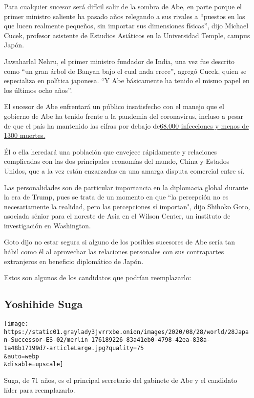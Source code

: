 Para cualquier sucesor será difícil salir de la sombra de Abe, en parte
porque el primer ministro saliente ha pasado años relegando a sus
rivales a ``puestos en los que lucen realmente pequeños, sin importar
sus dimensiones físicas'', dijo Michael Cucek, profesor asistente de
Estudios Asiáticos en la Universidad Temple, campus Japón.

Jawaharlal Nehru, el primer ministro fundador de India, una vez fue
descrito como ``un gran árbol de Banyan bajo el cual nada crece'',
agregó Cucek, quien se especializa en política japonesa. ``Y Abe
básicamente ha tenido el mismo papel en los últimos ocho años''.

El sucesor de Abe enfrentará un público insatisfecho con el manejo que
el gobierno de Abe ha tenido frente a la pandemia del coronavirus,
incluso a pesar de que el país ha mantenido las cifras por debajo
de\href{https://www.nytimes3xbfgragh.onion/interactive/2020/world/coronavirus-maps.html}{68.000
infecciones y menos de 1300 muertes.}

Él o ella heredará una población que envejece rápidamente y relaciones
complicadas con las dos principales economías del mundo, China y Estados
Unidos, que a la vez están enzarzadas en una amarga disputa comercial
entre sí.

Las personalidades son de particular importancia en la diplomacia global
durante la era de Trump, pues se trata de un momento en que ``la
percepción no es necesariamente la realidad, pero las percepciones sí
importan", dijo Shihoko Goto, asociada sénior para el noreste de Asia en
el Wilson Center, un instituto de investigación en Washington.

Goto dijo no estar segura si alguno de los posibles sucesores de Abe
sería tan hábil como él al aprovechar las relaciones personales con sus
contrapartes extranjeros en beneficio diplomático de Japón.

Estos son algunos de los candidatos que podrían reemplazarlo:

\hypertarget{yoshihide-suga}{%
\subsection{Yoshihide Suga}\label{yoshihide-suga}}

\texttt{[image: https://static01.graylady3jvrrxbe.onion/images/2020/08/28/world/28Japan-Successor-ES-02/merlin\_176189226\_83a41eb0-4798-42ea-838a-1a48b17199d7-articleLarge.jpg?quality=75\\\&auto=webp\\\&disable=upscale]}

Suga, de 71 años, es el principal secretario del gabinete de Abe y el
candidato líder para reemplazarlo.

